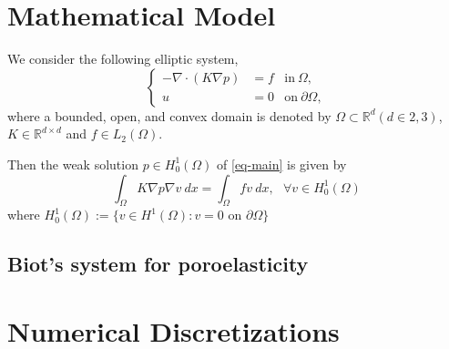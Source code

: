\documentclass[11pt]{article}
\begin{document}
\section{Mathematical Model}
We consider the following elliptic system,  
\begin{equation}\label{eq-main}
\left\{ 
\begin{array}{rll} 
-\nabla \cdot (K \nabla p)
&=  f
& \textrm{in}~\Omega, \\
u&=0& \textrm{on}~\partial \Omega,
\end{array}
\right.
\end{equation}
where a bounded, open, and convex domain is denoted by 
$\Omega \subset \mathbb{R}^d (d \in {2,3})$, $K\in \mathbb{R}^{d\times d}$ and $f \in L_2(\Omega)$.

Then the weak solution $p \in H_0^{1}(\Omega)$ 
of \eqref{eq-main} is given by 
\begin{equation}
\int_\Omega K \nabla p \nabla v \ dx = 
\int_\Omega f  v \ dx, \ \ \ \forall v \in H_0^1(\Omega)
\label{eq-weak}
\end{equation}
where $H_0^1(\Omega):= \{  v \in H^1(\Omega): v = 0 \text{ on } \partial \Omega \}$

\subsection{Biot's system for poroelasticity}

\section{Numerical Discretizations}
\end{document}
